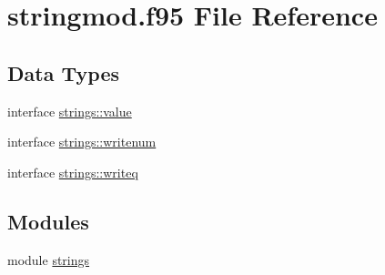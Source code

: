 \hypertarget{stringmod_8f95}{}\section{stringmod.\+f95 File Reference}
\label{stringmod_8f95}
\subsection*{Data Types}
\begin{DoxyCompactItemize}
\item 
interface \hyperlink{interfacestrings_1_1value}{strings\+::value}
\item 
interface \hyperlink{interfacestrings_1_1writenum}{strings\+::writenum}
\item 
interface \hyperlink{interfacestrings_1_1writeq}{strings\+::writeq}
\end{DoxyCompactItemize}
\subsection*{Modules}
\begin{DoxyCompactItemize}
\item 
module \hyperlink{namespacestrings}{strings}
\end{DoxyCompactItemize}
